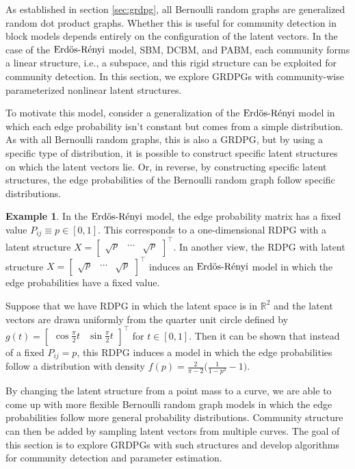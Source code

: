 \documentclass[
  11pt,
]{article}
\theoremstyle{definition}
\theoremstyle{definition}
\newtheorem{example}{Example}[section]
\theoremstyle{definition}
\theoremstyle{definition}
\theoremstyle{remark}
\begin{document}
As established in section \ref{sec:grdpg}, all Bernoulli random graphs are generalized random dot product graphs.
Whether this is useful for community detection in block models depends entirely on the configuration of the latent vectors.
In the case of the \(\text{Erd\"{o}s-R\'{e}nyi}\) model, SBM, DCBM, and PABM, each community forms a linear structure, i.e., a subspace, and this rigid structure can be exploited for community detection.
In this section, we explore GRDPGs with community-wise parameterized nonlinear latent structures.

To motivate this model, consider a generalization of the \(\text{Erd\"{o}s-R\'{e}nyi}\) model in which each edge probability isn't constant but comes from a simple distribution.
As with all Bernoulli random graphs, this is also a GRDPG, but by using a specific type of distribution, it is possible to construct specific latent structures on which the latent vectors lie.
Or, in reverse, by constructing specific latent structures, the edge probabilities of the Bernoulli random graph follow specific distributions.

\begin{example}
In the $\text{Erd\"{o}s-R\'{e}nyi}$ model, the edge probability matrix has a fixed value $P_{ij} \equiv p \in [0, 1]$. 
This corresponds to a one-dimensional RDPG with a latent structure $X = \begin{bmatrix} \sqrt{p} & \cdots & \sqrt{p} \end{bmatrix}^\top$. 
In another view, the RDPG with latent structure $X = \begin{bmatrix} \sqrt{p} & \cdots & \sqrt{p} \end{bmatrix}^\top$ induces an $\text{Erd\"{o}s-R\'{e}nyi}$ model in which the edge probabilities have a fixed value. 

Suppose that we have RDPG in which the latent space is in $\mathbb{R}^2$ and the latent vectors are drawn uniformly from the quarter unit circle defined by $g(t) = \begin{bmatrix} \cos \frac{\pi}{2} t & \sin \frac{\pi}{2} t \end{bmatrix}^\top$ for $t \in [0, 1]$. 
Then it can be shown that instead of a fixed $P_{ij} = p$, this RDPG induces a model in which the edge probabilities follow a distribution with density $f(p) = \frac{2}{\pi - 2} \Big( \frac{1}{1 - p^2} - 1 \Big)$. 
\end{example}

By changing the latent structure from a point mass to a curve, we are able to come up with more flexible Bernoulli random graph models in which the edge probabilities follow more general probability distributions.
Community structure can then be added by sampling latent vectors from multiple curves.
The goal of this section is to explore GRDPGs with such structures and develop algorithms for community detection and parameter estimation.
\end{document}
